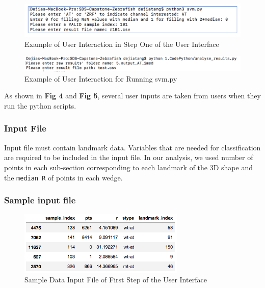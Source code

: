 \documentclass[10pt,letterpaper]{article}
\begin{document}
\begin{figure}[h]

{\centering \includegraphics{figures/Figure2} 

}

\caption{Example of User Interaction in Step One of the User Interface}\label{fig:useri}
\end{figure}

\begin{figure}[h]
\includegraphics[width=5.03in]{figures/Figure4} \caption{Example of User Interaction for Running svm.py}\label{fig:useri2}
\end{figure}

As shown in \textbf{Fig 4} and \textbf{Fig 5}, several user inputs are
taken from users when they run the python scripts.

\subsubsection{Input File}\label{input-file}

Input file must contain landmark data. Variables that are needed for
classification are required to be included in the input file. In our
analysis, we used number of points in each sub-section corresponding to
each landmark of the 3D shape and the \texttt{median\ R} of points in
each wedge.

\subsubsection{Sample input file}\label{sample-input-file}

\begin{figure}[h]

{\centering \includegraphics[width=300px]{figures/Figure3} 

}

\caption{Sample Data Input File of First Step of the User Interface}\label{fig:inputdata2}
\end{figure}
\end{document}
